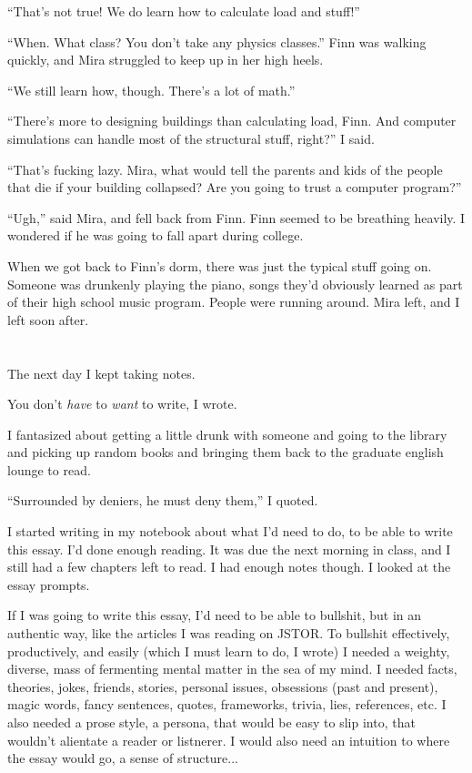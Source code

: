 ``That's not true!  We do learn how to calculate load and stuff!''

``When.  What class?  You don't take any physics classes.''  Finn was walking
quickly, and Mira struggled to keep up in her high heels.

``We still learn how, though.  There's a lot of math.''

``There's more to designing buildings than calculating load, Finn.  And computer
simulations can handle most of the structural stuff, right?'' I said.

``That's fucking lazy.  Mira, what would tell the parents and kids of the
people that die if your building collapsed?  Are you going to trust a computer
program?'' 

``Ugh,'' said Mira, and fell back from Finn.  Finn seemed to be breathing
heavily.  I wondered if he was going to fall apart during college.  

When we got back to Finn's dorm, there was just the typical stuff going on.
Someone was drunkenly playing the piano, songs they'd obviously learned as part
of their high school music program.  People were running around.  Mira left,
and I left soon after.  

\section{}

The next day I kept taking notes.

You don't \textit{have} to \textit{want} to write, I wrote.

I fantasized about getting a little drunk with someone and going to the library
and picking up random books and bringing them back to the graduate english
lounge to read.  

``Surrounded by deniers, he must deny them,'' I quoted.

I started writing in my notebook about what I'd need to do, to be able to write
this essay.  I'd done enough reading.  It was due the next morning in class, and
I still had a few chapters left to read.  I had enough notes though.  I looked
at the essay prompts.

If I was going to write this essay, I'd need to be able to bullshit, but in an
authentic way, like the articles I was reading on JSTOR.  To bullshit
effectively, productively, and easily (which I must learn to do, I wrote) I
needed a weighty, diverse, mass of fermenting mental matter in the sea of my
mind.  I needed facts, theories, jokes, friends, stories, personal issues,
obsessions (past and present), magic words, fancy sentences, quotes,
frameworks, trivia, lies, references, etc.  I also needed a prose style, a
persona, that would be easy to slip into, that wouldn't alientate a reader or
listnerer.  I would also need an intuition to where the essay would go, a sense
of structure...

